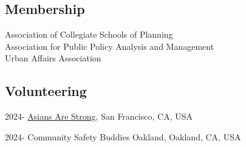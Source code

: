 \documentclass[11pt,letterpaper]{report}
\begin{document}
\subsection*{Membership}
Association of Collegiate Schools of Planning\\
Association for Public Policy Analysis and Management\\
Urban Affairs Association
\subsection*{Volunteering}
\begin{tablist}
\item[2024-] \tab{}\href{https://asiansarestrong.org/}{Asians Are Strong}, San Francisco, CA, USA
\item[2024-] \tab{}Community Safety Buddies Oakland, Oakland, CA, USA
\end{tablist}
\end{document}
